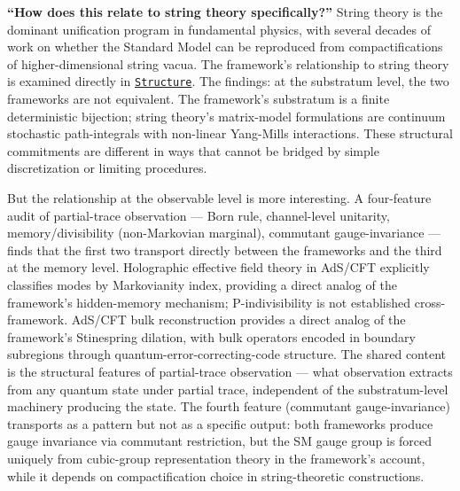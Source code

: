\documentclass[
]{article}
\begin{document}
\textbf{``How does this relate to string theory specifically?''} String
theory is the dominant unification program in fundamental physics, with
several decades of work on whether the Standard Model can be reproduced
from compactifications of higher-dimensional string vacua. The
framework's relationship to string theory is examined directly in
\href{Structure.md}{\texttt{Structure}}. The findings: at the substratum
level, the two frameworks are not equivalent. The framework's substratum
is a finite deterministic bijection; string theory's matrix-model
formulations are continuum stochastic path-integrals with non-linear
Yang-Mills interactions. These structural commitments are different in
ways that cannot be bridged by simple discretization or limiting
procedures.

But the relationship at the observable level is more interesting. A
four-feature audit of partial-trace observation --- Born rule,
channel-level unitarity, memory/divisibility (non-Markovian marginal),
commutant gauge-invariance --- finds that the first two transport
directly between the frameworks and the third at the memory level.
Holographic effective field theory in AdS/CFT explicitly classifies
modes by Markovianity index, providing a direct analog of the
framework's hidden-memory mechanism; P-indivisibility is not established
cross-framework. AdS/CFT bulk reconstruction provides a direct analog of
the framework's Stinespring dilation, with bulk operators encoded in
boundary subregions through quantum-error-correcting-code structure. The
shared content is the structural features of partial-trace observation
--- what observation extracts from any quantum state under partial
trace, independent of the substratum-level machinery producing the
state. The fourth feature (commutant gauge-invariance) transports as a
pattern but not as a specific output: both frameworks produce gauge
invariance via commutant restriction, but the SM gauge group is forced
uniquely from cubic-group representation theory in the framework's
account, while it depends on compactification choice in string-theoretic
constructions.
\end{document}
